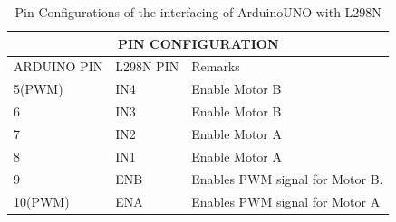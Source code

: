 \begin{table}[h]
\center
\begin{tabular}{ |p{3cm}|p{3cm}|p{3cm}| }
\hline
\multicolumn{3}{|c|}{PIN CONFIGURATION} \\
\hline
ARDUINO PIN& L298N PIN &Remarks\\
\hline
5(PWM) & IN4&Enable Motor B\\
\hline
6 & IN3&Enable Motor B\\
\hline
7 &IN2&Enable Motor A \\
\hline
8 &IN1 &Enable Motor A\\
\hline
9&ENB&Enables PWM signal for Motor B.\\
\hline
10(PWM)& ENA& Enables PWM signal for Motor A \\
\hline
\end{tabular}
\caption{Pin Configurations of the interfacing of ArduinoUNO with L298N}
\end{table}
